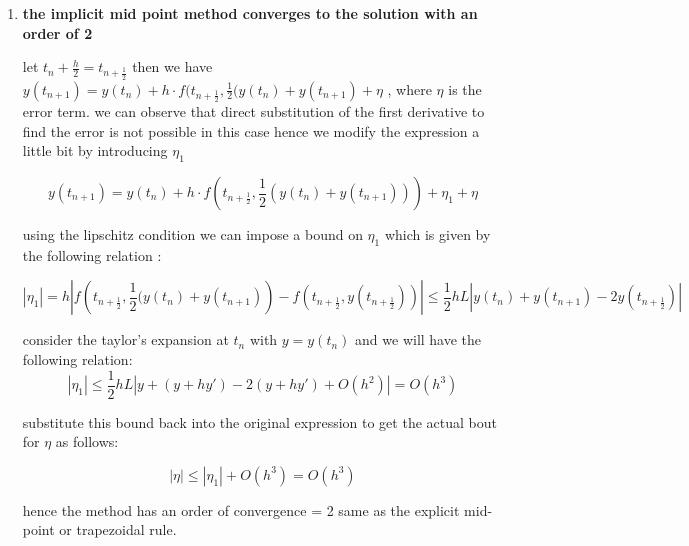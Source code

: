 \documentclass[12pt,letterpaper]{article}
\begin{document}
\begin{enumerate}
\item 
    
    \textbf{the implicit mid point method converges to the solution with an order of 2}

    let $t_{n}+\frac{h}{2} = t_{n+\frac{1}{2}}$ then we have $y(t_{n+1}) = y(t_n) + h \cdot f(t_{n+\frac{1}{2}},  \frac{1}{2}(y(t_n) + y(t_{n+1}) + \eta $ , where $\eta$ is the error term. we can observe that direct substitution of the first derivative to find the error is not possible in this case hence we modify the expression a little bit by introducing $\eta_1$
    
    \[y(t_{n+1}) = y(t_n) + h \cdot f\left(t_{n+\frac{1}{2}} ,  \frac{1}{2}(y(t_n) + y(t_{n+1}))\right) + \eta_1 + \eta \]
    
    using the lipschitz condition we can impose a bound on $\eta_1$ which is given by the following relation : 
    
    \[|\eta_1| =  h \left|f\left(t_{n+\frac{1}{2}},\frac{1}{2}(y(t_n)+y(t_{n+1})\right) - f\left(t_{n+\frac{1}{2}}, y(t_{n+\frac{1}{2}})\right) \right| \leq  \frac{1}{2} hL \left| y(t_{n}) + y(t_{n+1}) - 2 y(t_{n+\frac{1}{2}})\right|\]
    
    consider the taylor's expansion at $t_n$ with $y = y(t_n)$ and we will have the following relation:
    \[ |\eta_1| \leq \frac{1}{2}hL|y + (y+hy') - 2(y+hy') + O(h^2)| = O(h^3)\]
     
    substitute this bound back into the original expression to get the actual bout for $\eta$ as follows:
    
    \[|\eta| \leq |\eta_1| + O(h^3) = O(h^3)\]
    
    hence the method has an order of convergence = 2 same as the explicit mid-point or trapezoidal rule. 
\end{enumerate}
\end{document}
